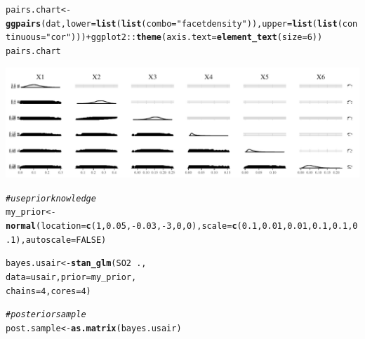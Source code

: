 \documentclass[11pt,a4paper,twoside]{book}\usepackage[]{graphicx}\usepackage[]{color}
\makeatletter
\newcommand{\hlnum}[1]{\textcolor[rgb]{0.686,0.059,0.569}{#1}}%
\newcommand{\hlstr}[1]{\textcolor[rgb]{0.192,0.494,0.8}{#1}}%
\newcommand{\hlcom}[1]{\textcolor[rgb]{0.678,0.584,0.686}{\textit{#1}}}%
\newcommand{\hlopt}[1]{\textcolor[rgb]{0,0,0}{#1}}%
\newcommand{\hlstd}[1]{\textcolor[rgb]{0.345,0.345,0.345}{#1}}%
\newcommand{\hlkwb}[1]{\textcolor[rgb]{0.69,0.353,0.396}{#1}}%
\newcommand{\hlkwc}[1]{\textcolor[rgb]{0.333,0.667,0.333}{#1}}%
\newcommand{\hlkwd}[1]{\textcolor[rgb]{0.737,0.353,0.396}{\textbf{#1}}}%
\newenvironment{kframe}{%
 \def\at@end@of@kframe{}%
 \ifinner\ifhmode%
  \def\at@end@of@kframe{\end{minipage}}%
  \begin{minipage}{\columnwidth}%
 \fi\fi%
 \def\FrameCommand##1{\hskip\@totalleftmargin \hskip-\fboxsep
 \colorbox{shadecolor}{##1}\hskip-\fboxsep
     \hskip-\linewidth \hskip-\@totalleftmargin \hskip\columnwidth}%
 \MakeFramed {\advance\hsize-\width
   \@totalleftmargin\z@ \linewidth\hsize
   \@setminipage}}%
 {\par\unskip\endMakeFramed%
 \at@end@of@kframe}
\newenvironment{knitrout}{}{} %
\makeatother
\begin{document}
\begin{knitrout}
\begin{kframe}
\begin{alltt}
\hlstd{pairs.chart} \hlkwb{<-} \hlkwd{ggpairs}\hlstd{(dat,} \hlkwc{lower} \hlstd{=} \hlkwd{list}\hlstd{(}\hlkwd{list}\hlstd{(}\hlkwc{combo} \hlstd{=} \hlstr{"facetdensity"}\hlstd{)),} \hlkwc{upper} \hlstd{=} \hlkwd{list}\hlstd{(}\hlkwd{list}\hlstd{(}\hlkwc{continuous} \hlstd{=} \hlstr{"cor"}\hlstd{)))} \hlopt{+} \hlstd{ggplot2}\hlopt{::}\hlkwd{theme}\hlstd{(}\hlkwc{axis.text} \hlstd{=} \hlkwd{element_text}\hlstd{(}\hlkwc{size} \hlstd{=} \hlnum{6}\hlstd{))}
\hlstd{pairs.chart}
\end{alltt}
\end{kframe}

{\centering \includegraphics[width=\textwidth-3cm]{figure/ch03_figreal_data_LMG-1} 

}


\begin{kframe}\begin{alltt}
\hlcom{#use prior knowledge}
\hlstd{my_prior} \hlkwb{<-} \hlkwd{normal}\hlstd{(}\hlkwc{location} \hlstd{=} \hlkwd{c}\hlstd{(}\hlnum{1}\hlstd{,} \hlnum{0.05}\hlstd{,}\hlopt{-}\hlnum{0.03}\hlstd{,}\hlopt{-}\hlnum{3}\hlstd{,} \hlnum{0}\hlstd{,} \hlnum{0}\hlstd{),} \hlkwc{scale} \hlstd{=} \hlkwd{c}\hlstd{(}\hlnum{0.1}\hlstd{,} \hlnum{0.01}\hlstd{,}\hlnum{0.01}\hlstd{,}\hlnum{0.1}\hlstd{,} \hlnum{0.1}\hlstd{,} \hlnum{0.1}\hlstd{),} \hlkwc{autoscale} \hlstd{=} \hlnum{FALSE}\hlstd{)}


\hlstd{bayes.usair} \hlkwb{<-} \hlkwd{stan_glm}\hlstd{(SO2} \hlopt{~} \hlstd{. ,}
                  \hlkwc{data} \hlstd{= usair,} \hlkwc{prior} \hlstd{= my_prior,}
                  \hlkwc{chains} \hlstd{=} \hlnum{4}\hlstd{,} \hlkwc{cores} \hlstd{=} \hlnum{4}\hlstd{)}

\hlcom{#posterior sample}
\hlstd{post.sample} \hlkwb{<-} \hlkwd{as.matrix}\hlstd{(bayes.usair)}


\end{alltt}
\end{kframe}
\end{knitrout}
\end{document}
